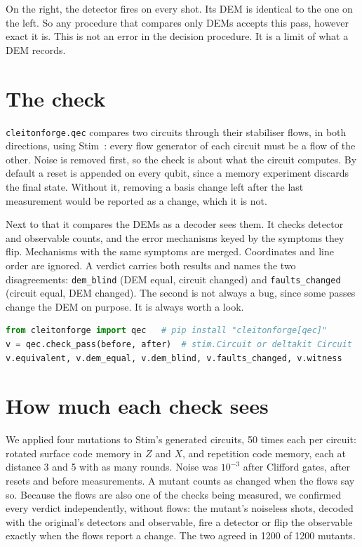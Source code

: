\documentclass[10pt]{article}
\begin{document}
On the right, the detector fires on every shot. Its DEM is identical to the one
on the left. So any procedure that compares only DEMs accepts this pass, however
exact it is. This is not an error in the decision procedure. It is a limit of
what a DEM records.

\section{The check}

\texttt{cleitonforge.qec} compares two circuits through their stabiliser flows,
in both directions, using Stim~\cite{gidney2021}: every flow generator of each
circuit must be a flow of the other. Noise is removed first, so the check is
about what the circuit computes. By default a reset is appended on every qubit,
since a memory experiment discards the final state. Without it, removing a
basis change left after the last measurement would be reported as a change,
which it is not.

Next to that it compares the DEMs as a decoder sees them. It checks detector and
observable counts, and the error mechanisms keyed by the symptoms they flip.
Mechanisms with the same symptoms are merged. Coordinates and line order are
ignored. A verdict carries both results and names the two disagreements:
\texttt{dem\_blind} (DEM equal, circuit changed) and \texttt{faults\_changed}
(circuit equal, DEM changed). The second is not always a bug, since some passes
change the DEM on purpose. It is always worth a look.

\begin{lstlisting}[language=Python]
from cleitonforge import qec   # pip install "cleitonforge[qec]"
v = qec.check_pass(before, after)  # stim.Circuit or deltakit Circuit
v.equivalent, v.dem_equal, v.dem_blind, v.faults_changed, v.witness
\end{lstlisting}

\section{How much each check sees}

We applied four mutations to Stim's generated circuits, 50 times each per
circuit: rotated surface code memory in $Z$ and $X$, and repetition code memory,
each at distance 3 and 5 with as many rounds. Noise was $10^{-3}$ after Clifford
gates, after resets and before measurements. A mutant counts as changed when
the flows say so. Because the flows are also one of the checks being measured,
we confirmed every verdict independently, without flows: the mutant's noiseless
shots, decoded with the original's detectors and observable, fire a detector or
flip the observable exactly when the flows report a change. The two agreed in
1200 of 1200 mutants.
\end{document}
